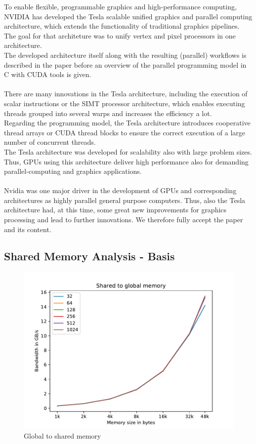 \documentclass[12pt]{article}
\begin{document}
To enable flexible, programmable graphics and high-performance computing, NVIDIA has developed the Tesla scalable unified graphics and parallel computing architecture, which extends the functionality of traditional graphics pipelines. The goal for that architeture was to unify vertex and pixel processors in one architecture.\\
The developed architecture itself along with the resulting (parallel) workflows is described in the paper before an overview of the parallel programming model in C with CUDA tools is given.\\\\
There are many innovations in the Tesla architecture, including the execution of scalar instructions or the SIMT processor architecture, which enables executing threads grouped into several warps and increases the efficiency a lot.\\
Regarding the programming model, the Tesla architecture introduces cooperative thread arrays or CUDA thread blocks to ensure the correct execution of a large number of concurrent threads.\\
The Tesla architecture was developed for scalability also with large problem sizes. Thus, GPUs using this architecture deliver high performance also for demanding parallel-computing and graphics applications. \\\\
Nvidia was one major driver in the development of GPUs and corresponding architectures as highly parallel general purpose computers. Thus, also the Tesla architecture had, at this time, some great new improvements for graphics processing and lead to further innovations. We therefore fully accept the paper and its content.
\vspace{10pt}

\subsection{Shared Memory Analysis - Basis}

\begin{figure}[H]
	\centering
	\includegraphics[width=0.7\linewidth]{../../template/plots/aufgabe4_2a}
	\caption{Global to shared memory}
	\label{fig:aufgabe42a}
\end{figure}
\end{document}
